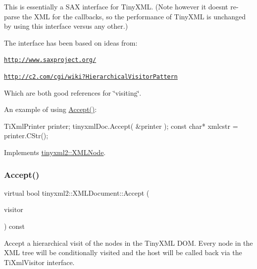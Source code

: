 This is essentially a S\+AX interface for Tiny\+X\+ML. (Note however it doesn\textquotesingle{}t re-\/parse the X\+ML for the callbacks, so the performance of Tiny\+X\+ML is unchanged by using this interface versus any other.)

The interface has been based on ideas from\+:


\begin{DoxyItemize}
\item \href{http://www.saxproject.org/}{\tt http\+://www.\+saxproject.\+org/}
\item \href{http://c2.com/cgi/wiki?HierarchicalVisitorPattern}{\tt http\+://c2.\+com/cgi/wiki?\+Hierarchical\+Visitor\+Pattern}
\end{DoxyItemize}

Which are both good references for \char`\"{}visiting\char`\"{}.

An example of using \hyperlink{classtinyxml2_1_1XMLDocument_ab7be651917a35ab1ff0e4e6d4e565cdf}{Accept()}\+: \begin{DoxyVerb}TiXmlPrinter printer;
tinyxmlDoc.Accept( &printer );
const char* xmlcstr = printer.CStr();
\end{DoxyVerb}
 

Implements \hyperlink{classtinyxml2_1_1XMLNode_a81e66df0a44c67a7af17f3b77a152785}{tinyxml2\+::\+X\+M\+L\+Node}.

\mbox{\label{classtinyxml2_1_1XMLDocument_a9efa54f7ecb37c17ab1fa2b3078ccca1}} 
\subsubsection{\texorpdfstring{Accept()}{Accept()}\hspace{0.1cm}{\footnotesize\ttfamily [2/2]}}
{\footnotesize\ttfamily virtual bool tinyxml2\+::\+X\+M\+L\+Document\+::\+Accept (\begin{DoxyParamCaption}\item[{\hyperlink{classtinyxml2_1_1XMLVisitor}{X\+M\+L\+Visitor} $\ast$}]{visitor }\end{DoxyParamCaption}) const\hspace{0.3cm}{\ttfamily [virtual]}}

Accept a hierarchical visit of the nodes in the Tiny\+X\+ML D\+OM. Every node in the X\+ML tree will be conditionally visited and the host will be called back via the Ti\+Xml\+Visitor interface.

